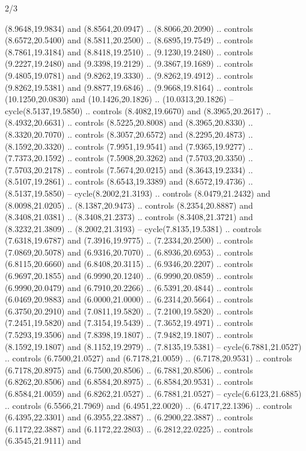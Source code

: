 \begin{flagdescription}{2/3}
\begin{scope}[yshift=\flagwidth,scale=\flagwidth/1241.93737]
\begin{scope}[y=-1mm, x=1mm,draw=gold,fill=blue,line join=miter,miter limit=4,line width=1.8\lw]
{  (8.9648,19.9834) and (8.8564,20.0947) .. (8.8066,20.2090) .. controls
  (8.6572,20.5400) and (8.5811,20.2500) .. (8.6895,19.7549) .. controls
  (8.7861,19.3184) and (8.8418,19.2510) .. (9.1230,19.2480) .. controls
  (9.2227,19.2480) and (9.3398,19.2129) .. (9.3867,19.1689) .. controls
  (9.4805,19.0781) and (9.8262,19.3330) .. (9.8262,19.4912) .. controls
  (9.8262,19.5381) and (9.8877,19.6846) .. (9.9668,19.8164) .. controls
  (10.1250,20.0830) and (10.1426,20.1826) .. (10.0313,20.1826) --
  cycle(8.5137,19.5850) .. controls (8.4082,19.6670) and (8.3965,20.2617) ..
  (8.4932,20.6631) .. controls (8.5225,20.8008) and (8.3965,20.8330) ..
  (8.3320,20.7070) .. controls (8.3057,20.6572) and (8.2295,20.4873) ..
  (8.1592,20.3320) .. controls (7.9951,19.9541) and (7.9365,19.9277) ..
  (7.7373,20.1592) .. controls (7.5908,20.3262) and (7.5703,20.3350) ..
  (7.5703,20.2178) .. controls (7.5674,20.0215) and (8.3643,19.2334) ..
  (8.5107,19.2861) .. controls (8.6543,19.3389) and (8.6572,19.4736) ..
  (8.5137,19.5850) -- cycle(8.2002,21.3193) .. controls (8.0479,21.2432) and
  (8.0098,21.0205) .. (8.1387,20.9473) .. controls (8.2354,20.8887) and
  (8.3408,21.0381) .. (8.3408,21.2373) .. controls (8.3408,21.3721) and
  (8.3232,21.3809) .. (8.2002,21.3193) -- cycle(7.8135,19.5381) .. controls
  (7.6318,19.6787) and (7.3916,19.9775) .. (7.2334,20.2500) .. controls
  (7.0869,20.5078) and (6.9316,20.7070) .. (6.8936,20.6953) .. controls
  (6.8115,20.6660) and (6.8408,20.3115) .. (6.9346,20.2207) .. controls
  (6.9697,20.1855) and (6.9990,20.1240) .. (6.9990,20.0859) .. controls
  (6.9990,20.0479) and (6.7910,20.2266) .. (6.5391,20.4844) .. controls
  (6.0469,20.9883) and (6.0000,21.0000) .. (6.2314,20.5664) .. controls
  (6.3750,20.2910) and (7.0811,19.5820) .. (7.2100,19.5820) .. controls
  (7.2451,19.5820) and (7.3154,19.5439) .. (7.3652,19.4971) .. controls
  (7.5293,19.3506) and (7.8398,19.1807) .. (7.9482,19.1807) .. controls
  (8.1592,19.1807) and (8.1152,19.2979) .. (7.8135,19.5381) --
  cycle(6.7881,21.0527) .. controls (6.7500,21.0527) and (6.7178,21.0059) ..
  (6.7178,20.9531) .. controls (6.7178,20.8975) and (6.7500,20.8506) ..
  (6.7881,20.8506) .. controls (6.8262,20.8506) and (6.8584,20.8975) ..
  (6.8584,20.9531) .. controls (6.8584,21.0059) and (6.8262,21.0527) ..
  (6.7881,21.0527) -- cycle(6.6123,21.6885) .. controls (6.5566,21.7969) and
  (6.4951,22.0020) .. (6.4717,22.1396) .. controls (6.4395,22.3301) and
  (6.3955,22.3887) .. (6.2900,22.3887) .. controls (6.1172,22.3887) and
  (6.1172,22.2803) .. (6.2812,22.0225) .. controls (6.3545,21.9111) and
}
\end{scope}
\end{scope}
\end{flagdescription}
